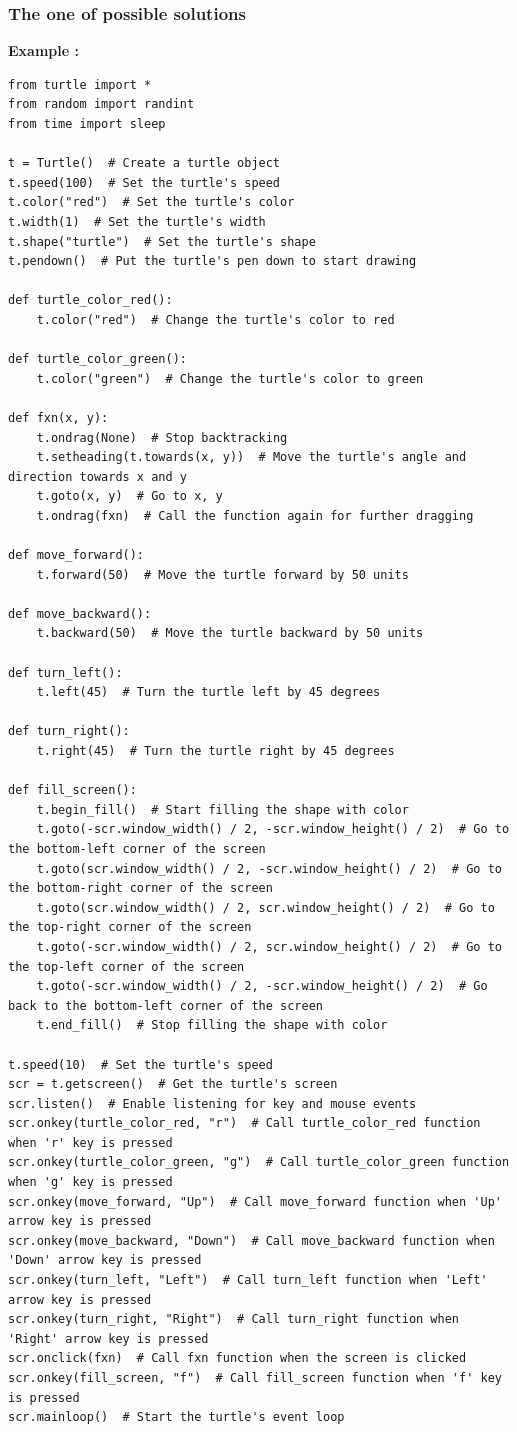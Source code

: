 \documentclass[12pt]{book}
\newtheorem{Example}{Example}[chapter]
\renewenvironment{Example}{\begin{trivlist}\item\relax
\textbf{Example \thesection: }}{\end{trivlist}}
\begin{document}
\subsubsection{The one of possible solutions}
\begin{Example}
\begin{lstlisting}
from turtle import *
from random import randint
from time import sleep

t = Turtle()  # Create a turtle object
t.speed(100)  # Set the turtle's speed
t.color("red")  # Set the turtle's color
t.width(1)  # Set the turtle's width
t.shape("turtle")  # Set the turtle's shape
t.pendown()  # Put the turtle's pen down to start drawing

def turtle_color_red():
    t.color("red")  # Change the turtle's color to red

def turtle_color_green():
    t.color("green")  # Change the turtle's color to green

def fxn(x, y):
    t.ondrag(None)  # Stop backtracking
    t.setheading(t.towards(x, y))  # Move the turtle's angle and direction towards x and y
    t.goto(x, y)  # Go to x, y
    t.ondrag(fxn)  # Call the function again for further dragging

def move_forward():
    t.forward(50)  # Move the turtle forward by 50 units

def move_backward():
    t.backward(50)  # Move the turtle backward by 50 units

def turn_left():
    t.left(45)  # Turn the turtle left by 45 degrees

def turn_right():
    t.right(45)  # Turn the turtle right by 45 degrees

def fill_screen():
    t.begin_fill()  # Start filling the shape with color
    t.goto(-scr.window_width() / 2, -scr.window_height() / 2)  # Go to the bottom-left corner of the screen
    t.goto(scr.window_width() / 2, -scr.window_height() / 2)  # Go to the bottom-right corner of the screen
    t.goto(scr.window_width() / 2, scr.window_height() / 2)  # Go to the top-right corner of the screen
    t.goto(-scr.window_width() / 2, scr.window_height() / 2)  # Go to the top-left corner of the screen
    t.goto(-scr.window_width() / 2, -scr.window_height() / 2)  # Go back to the bottom-left corner of the screen
    t.end_fill()  # Stop filling the shape with color

t.speed(10)  # Set the turtle's speed
scr = t.getscreen()  # Get the turtle's screen
scr.listen()  # Enable listening for key and mouse events
scr.onkey(turtle_color_red, "r")  # Call turtle_color_red function when 'r' key is pressed
scr.onkey(turtle_color_green, "g")  # Call turtle_color_green function when 'g' key is pressed
scr.onkey(move_forward, "Up")  # Call move_forward function when 'Up' arrow key is pressed
scr.onkey(move_backward, "Down")  # Call move_backward function when 'Down' arrow key is pressed
scr.onkey(turn_left, "Left")  # Call turn_left function when 'Left' arrow key is pressed
scr.onkey(turn_right, "Right")  # Call turn_right function when 'Right' arrow key is pressed
scr.onclick(fxn)  # Call fxn function when the screen is clicked
scr.onkey(fill_screen, "f")  # Call fill_screen function when 'f' key is pressed
scr.mainloop()  # Start the turtle's event loop


\end{lstlisting}
\end{Example}
\end{document}
